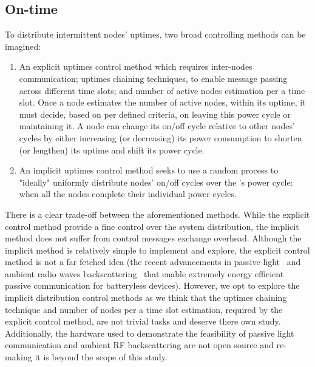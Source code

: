 \subsection{\fullsys On-time}
To distribute intermittent nodes' uptimes, two broad controlling methods can be imagined:
\begin{enumerate}[wide, labelwidth=!, labelindent=0pt]
		\item An explicit uptimes control method which requires inter-nodes communication; uptimes chaining techniques, to enable message passing across different time slots; and number of active nodes estimation per a time slot. Once a node estimates the number of active nodes, within its uptime, it must decide, based on per defined criteria, on leaving this power cycle or maintaining it. A node can change its on/off cycle relative to other nodes' cycles by either increasing (or decreasing) its power consumption to shorten (or lengthen) its uptime and shift its power cycle. 
		\item An implicit uptimes control method seeks to use a random process to "ideally" uniformly distribute nodes' on/off cycles over the \sys's power cycle: when all the nodes complete their individual power cycles.  
\end{enumerate}
There is a clear trade-off between the aforementioned methods. While the explicit control method provide a fine control over the system distribution, the implicit method does not suffer from control messages exchange overhead. Although the implicit method is relatively simple to implement and explore, the explicit control method is not a far fetched idea (the recent advancements in passive light~\cite{marco} and ambient radio waves backscattering~\cite{} that enable extremely energy efficient passive communication for batteryless devices). However, we opt to explore the implicit distribution control methods as we think that the uptimes chaining technique and number of nodes per a time slot estimation, required by the explicit control method, are not trivial tasks and deserve there own study. Additionally, the hardware used to demonstrate the feasibility of passive light communication and ambient RF backscattering are not open source and re-making it is beyond the scope of this study.

